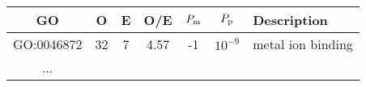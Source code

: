\begin{tabular}{ccccccl}
  \hline
  GO & O & E & O/E & $P_{\rm m}$ & $P_{\rm p}$ & Description\\\hline
  GO:0046872  & 32   & 7   & 4.57  & -1 & $10^{-9}$ & metal ion binding\\
  ...\\
  \hline
\end{tabular}
